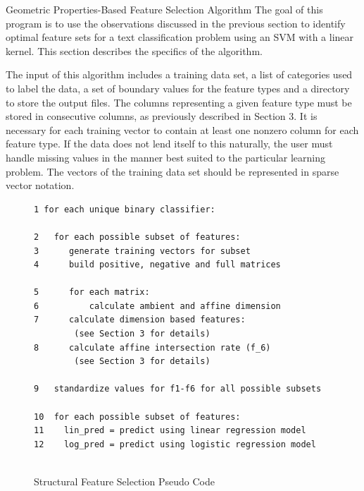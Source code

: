 \documentclass{llncs}
\begin{document}
\begin{section}{Geometric Properties-Based Feature Selection Algorithm}
The goal of this program is to use the observations discussed in the previous section to identify optimal feature sets for a text classification problem using an SVM with a linear kernel. This section describes the specifics of the algorithm.


The input of this algorithm includes a training data set, a list of categories used to label the data, a set of boundary values for the feature types and a directory to store the output files. The columns representing a given feature type must be stored in consecutive columns, as  previously described in Section 3. It is necessary for each training vector to contain at least one nonzero column for each feature type. If the data does not lend itself to this naturally, the user must handle missing values in the manner best suited to the particular learning problem. The vectors of the training data set should be represented in sparse vector notation.

\begin{figure}[h]
\caption{Structural Feature Selection Pseudo Code}
\begin{lstlisting}
1 for each unique binary classifier:
			
2   for each possible subset of features:
3	   generate training vectors for subset
4	   build positive, negative and full matrices
		
5	   for each matrix:
6		   calculate ambient and affine dimension
7	   calculate dimension based features:
		(see Section 3 for details)
8	   calculate affine intersection rate (f_6)
		(see Section 3 for details)
		
9 	standardize values for f1-f6 for all possible subsets
	
10  for each possible subset of features:
11	  lin_pred = predict using linear regression model
12	  log_pred = predict using logistic regression model


\end{lstlisting}
\end{figure}
\end{section}
\end{document}
